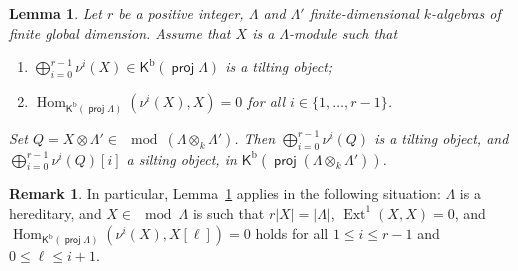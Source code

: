 \documentclass[a4paper,reqno,11pt]{amsart}
\newtheorem{lemma}[theorem]{Lemma}
\theoremstyle{definition}
\newtheorem{remark}[theorem]{Remark}
\newcommand{\KKK}{\mathsf{K}}
\newcommand{\bo}{\operatorname{b}\nolimits}
\newcommand{\Ext}{\operatorname{Ext}\nolimits}
\newcommand{\Hom}{\operatorname{Hom}\nolimits}
\newcommand{\gl}{\operatorname{gl.\!dim}\nolimits}
\DeclareMathOperator{\proj}{\mathsf{proj}}
\numberwithin{equation}{section}
\begin{document}
\begin{lemma} \label{tiltandsilt}
  Let $r$ be a positive integer, $\Lambda$ and $\Lambda'$ finite-dimensional $k$-algebras of finite global dimension. Assume that $X$ is a $\Lambda$-module such that
  \begin{enumerate}\renewcommand{\theenumi}{\roman{enumi}}
  \item  $\bigoplus_{i=0}^{r-1}\nu^i(X)\in\KKK^{\bo}(\proj\Lambda)$ is a tilting object;
  \item $\Hom_{\KKK^{\bo}(\proj\Lambda)}(\nu^i(X),X) = 0$ for all $i\in\{1,\ldots, r-1\}$. 
  \end{enumerate}
  Set $Q = X\otimes\Lambda'\in\mod\left(\Lambda\otimes_k\Lambda'\right)$. 
  Then $\bigoplus_{i=0}^{r-1}\nu^i(Q)$ %
  is a tilting object, and
$\bigoplus_{i=0}^{r-1}\nu^i(Q)[i]$ %
  a silting object, in $\KKK^{\bo}(\proj\left(\Lambda\otimes_k\Lambda'\right))$.
\end{lemma}
%
%

\begin{remark}
In particular, Lemma~\ref{tiltandsilt} applies in the following situation:
$\Lambda$ is a hereditary, and $X\in\mod\Lambda$ is such that $r|X| = |\Lambda|$, $\Ext^1(X,X) = 0$, and $\Hom_{\KKK^{\bo}(\proj\Lambda)}(\nu^i(X),X[\ell]) = 0$ holds for all $1\le i \le r-1$ and $0\le \ell\le i+1$.%
\end{remark}
\end{document}
